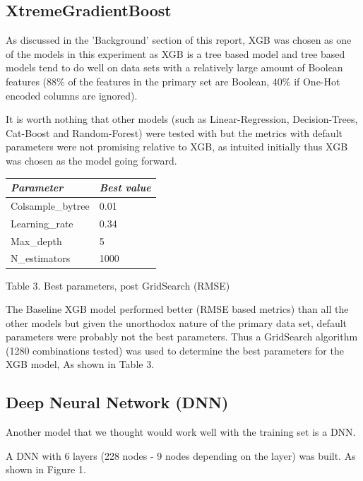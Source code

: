 \documentclass[conference]{IEEEtran}
\begin{document}
\subsection{XtremeGradientBoost}

As discussed in the 'Background' section of this report, XGB was chosen as one of the models in this experiment as XGB is a tree based model and tree based models tend to do well on data sets with a relatively large amount of Boolean features (88\% of the features in the primary set are Boolean, 40\% if One-Hot encoded columns are ignored). 

It is worth nothing that other models (such as Linear-Regression, Decision-Trees, Cat-Boost and Random-Forest) were tested with but the metrics with default parameters were not promising relative to XGB, as intuited initially thus XGB was chosen as the model going forward. 

\smallbreak
\smallbreak
\smallbreak
\smallbreak
\begin{tabular}{|l|l|}
\hline
\textit{\textbf{Parameter}} & \textit{\textbf{Best value}} \\ \hline
Colsample\_bytree           & 0.01                         \\ \hline
Learning\_rate              & 0.34                         \\ \hline
Max\_depth                  & 5                            \\ \hline
N\_estimators               & 1000                         \\ \hline
\end{tabular}
\smallbreak
\caption{Table 3. Best parameters, post GridSearch (RMSE)}
\smallbreak
\smallbreak
\smallbreak
\smallbreak


The Baseline XGB model performed better (RMSE based metrics) than all the other models but given the unorthodox nature of the primary data set, default parameters were probably not the best parameters. Thus a GridSearch algorithm (1280 combinations tested) was used to determine the best parameters for the XGB model, As shown in Table 3.

\subsection{Deep Neural Network (DNN)}

Another model that we thought would work well with the training set is a DNN. 

A DNN with 6 layers (228 nodes - 9 nodes depending on the layer) was built. As shown in Figure 1. 
  
\end{document}
